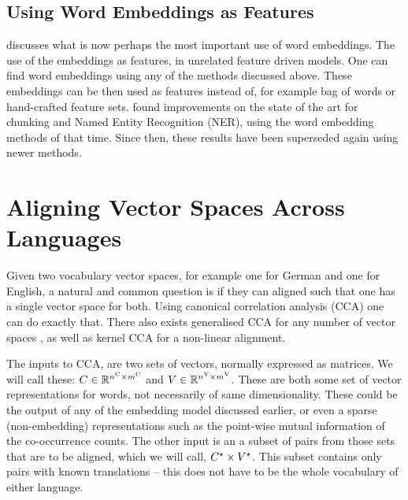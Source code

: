 \documentclass[parskip]{komatufte}
\begin{document}
\subsection{Using Word Embeddings as Features}


 discusses what is now perhaps the most important use of word embeddings.
The use of the embeddings as features, in unrelated feature driven models.
One can find word embeddings using any of the methods discussed above.
These embeddings can be then used as features instead of, for example bag of words or hand-crafted feature sets.
\textcite{turian2010word} found improvements on the state of the art for chunking and Named Entity Recognition (NER), using the word embedding methods of that time.
Since then, these results have been superseded again using newer methods.


\section{Aligning Vector Spaces Across Languages}\label{sec:aligning-vector-spaces-across-languages}
Given two vocabulary vector spaces, for example one for German and one for English,
a natural and common question is if they can aligned such that one has a single vector space for both.
Using canonical correlation analysis (CCA) one can do exactly that.
There also exists generalised CCA for any number of vector spaces ,
as well as kernel CCA for a non-linear alignment.

The inputs to CCA, are two sets of vectors, normally expressed as matrices.
We will call these:
$C \in \mathbb{R}^{\d n_C \times \d m_C}$ and $V \in \mathbb{R}^{\d n_V \times \d m_V}$.
These are both some set of vector representations for words, not necessarily of same dimensionality.
These could be the output of any of the embedding model discussed earlier,
or even a sparse (non-embedding) representations such as the point-wise mutual information of the co-occurrence counts.
The other input is an a subset of pairs from those sets that are to be aligned, which we will call, $\d C_\star \times \d V_\star$.
This subset contains only pairs with known translations -- this does not have to be the whole vocabulary of either language.
\end{document}
